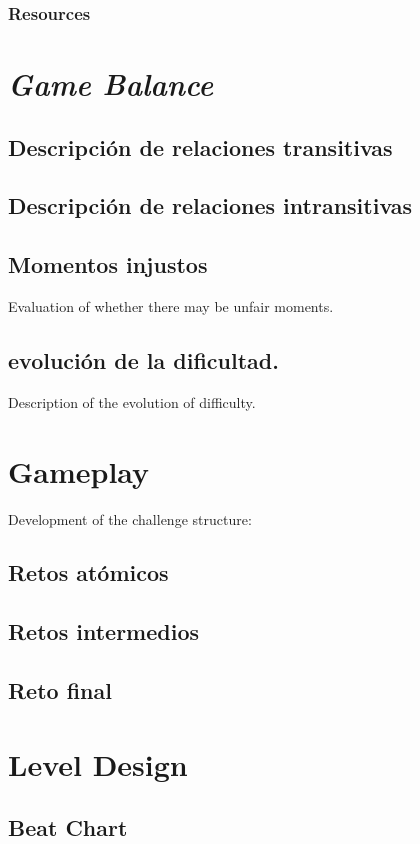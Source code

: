         \subsubsection{Resources}

\section{\textit{Game Balance}}
    \subsection{Descripción de relaciones transitivas}
    \subsection{Descripción de relaciones intransitivas}
    \subsection{Momentos injustos}
    Evaluation of whether there may be unfair moments.
    \subsection{ evolución de la dificultad.}
    Description of the evolution of difficulty.

\section{Gameplay}
Development of the challenge structure:
    \subsection{Retos atómicos}
    \subsection{Retos intermedios }
    \subsection{Reto final}

\section{Level Design} \label{levelDesign}
    \subsection{Beat Chart}
